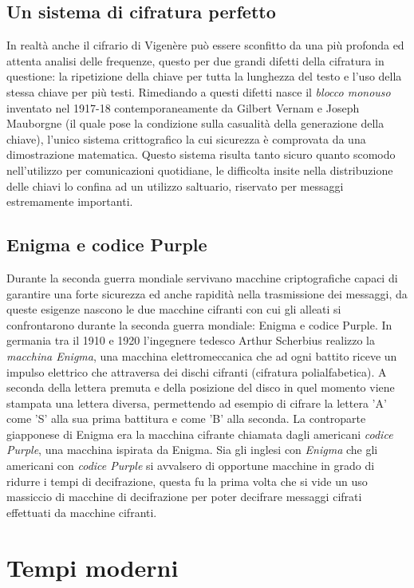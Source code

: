\documentclass[a4paper, 12pt]{article}
\begin{document}
\subsection{Un sistema di cifratura perfetto}
In realtà anche il cifrario di Vigenère può essere sconfitto da una più profonda ed attenta analisi delle frequenze, questo per due grandi difetti della cifratura in questione: la ripetizione della chiave per tutta la lunghezza del testo e l'uso della stessa chiave per più testi.\newline
Rimediando a questi difetti nasce il \textit{blocco monouso} inventato nel 1917-18 contemporaneamente da Gilbert Vernam e Joseph Mauborgne (il quale pose la condizione sulla casualità della generazione della chiave), l'unico sistema crittografico la cui sicurezza è comprovata da una dimostrazione matematica. Questo sistema risulta tanto sicuro quanto scomodo nell'utilizzo per comunicazioni quotidiane, le difficolta insite nella distribuzione delle chiavi lo confina ad un utilizzo saltuario, riservato per messaggi estremamente importanti.
\subsection{Enigma e codice Purple}
Durante la seconda guerra mondiale servivano macchine criptografiche capaci di garantire una forte sicurezza ed anche rapidità nella trasmissione dei messaggi, da queste esigenze nascono le due macchine cifranti con cui gli alleati si confrontarono durante la seconda guerra mondiale: Enigma e codice Purple.
In germania tra il 1910 e 1920 l'ingegnere tedesco Arthur Scherbius realizzo la \textit{macchina Enigma}, una macchina elettromeccanica che ad ogni battito riceve un impulso elettrico che attraversa dei dischi cifranti (cifratura polialfabetica). A seconda della lettera premuta e della posizione del disco in quel momento viene stampata una lettera diversa, permettendo ad esempio di cifrare la lettera 'A' come 'S' alla sua prima battitura e come 'B' alla seconda.
La controparte giapponese di Enigma era la macchina cifrante chiamata dagli americani \textit{codice Purple}, una macchina ispirata da Enigma.\newline
Sia gli inglesi con \textit{Enigma} che gli americani con \textit{codice Purple} si avvalsero di opportune macchine in grado di ridurre i tempi di decifrazione, questa fu la prima volta che si vide un uso massiccio di macchine di decifrazione per poter decifrare messaggi cifrati effettuati da macchine cifranti.

\section{Tempi moderni}
\end{document}
